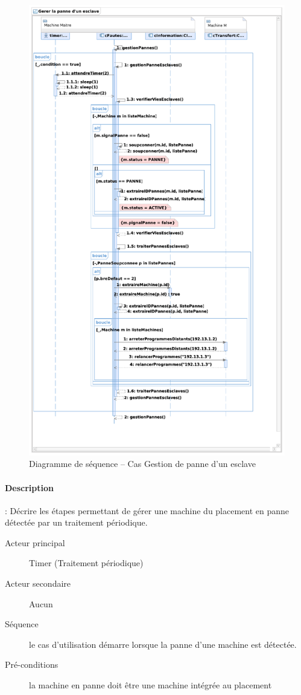   \begin{figure}[h!]
    \centering
    \includegraphics[scale=0.409]{img/analyse_DSseqpanneEsclave.pdf}
    \caption{Diagramme de séquence -- Cas Gestion de panne d'un esclave}
  \end{figure}

    \paragraph{Description} : Décrire les étapes permettant de gérer une machine du placement en panne détectée
    par un traitement périodique.
    \begin{description}
      \item[Acteur principal] Timer (Traitement périodique)
      \item[Acteur secondaire] Aucun
      \item[Séquence] le cas d'utilisation démarre lorsque la panne d'une machine est détectée.
      \item[Pré-conditions] la machine en panne doit être une machine intégrée au placement
    \end{description}
